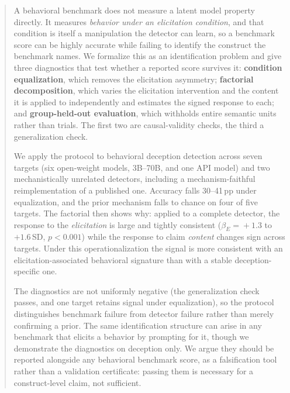\begin{abstract}
A behavioral benchmark does not measure a latent model property directly. It measures \emph{behavior under an elicitation condition}, and that condition is itself a manipulation the detector can learn, so a benchmark score can be highly accurate while failing to identify the construct the benchmark names. We formalize this as an identification problem and give three diagnostics that test whether a reported score survives it: \textbf{condition equalization}, which removes the elicitation asymmetry; \textbf{factorial decomposition}, which varies the elicitation intervention and the content it is applied to independently and estimates the signed response to each; and \textbf{group-held-out evaluation}, which withholds entire semantic units rather than trials. The first two are causal-validity checks, the third a generalization check.

We apply the protocol to behavioral deception detection across seven targets (six open-weight models, 3B--70B, and one API model) and two mechanistically unrelated detectors, including a mechanism-faithful reimplementation of a published one. Accuracy falls 30--41\,pp under equalization, and the prior mechanism falls to chance on four of five targets. The factorial then shows why: applied to a complete detector, the response to the \emph{elicitation} is large and tightly consistent ($\beta_E\!=\!+1.3$ to $+1.6$\,SD, $p\!<\!0.001$) while the response to claim \emph{content} changes sign across targets. Under this operationalization the signal is more consistent with an elicitation-associated behavioral signature than with a stable deception-specific one.

The diagnostics are not uniformly negative (the generalization check passes, and one target retains signal under equalization), so the protocol distinguishes benchmark failure from detector failure rather than merely confirming a prior. The same identification structure can arise in any benchmark that elicits a behavior by prompting for it, though we demonstrate the diagnostics on deception only. We argue they should be reported alongside any behavioral benchmark score, as a falsification tool rather than a validation certificate: passing them is necessary for a construct-level claim, not sufficient.
\end{abstract}
